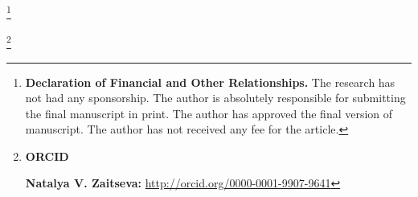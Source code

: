 \RuDate

\renewcommand{\baselinestretch}{0.95}

\newpage

\makeentitle

\thanks{{\bf Declaration of Financial and Other Relationships.}
The research has not had any sponsorship.
The author is absolutely responsible for submitting the final manuscript in print.
The author has approved the final version of manuscript.
The author has not received any fee for the article.
}


\thanks{{\bf ORCID}

{\bf Natalya V. Zaitseva:} \url{http://orcid.org/0000-0001-9907-9641}

}

\pagebreak

\EngRef

